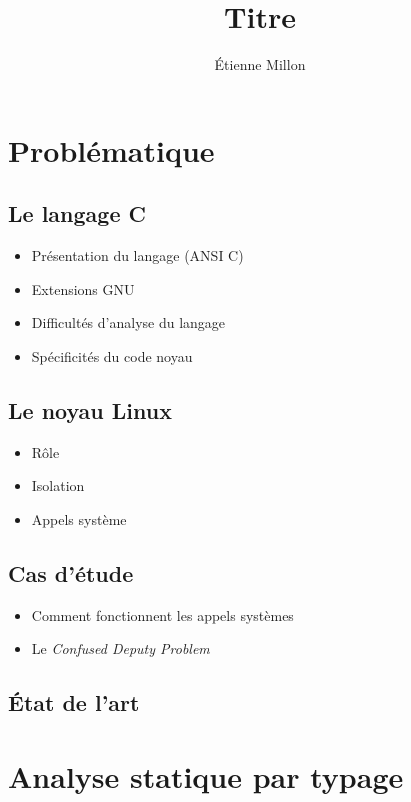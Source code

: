 \documentclass{phdthesis}
\title{Titre}
\author{Étienne Millon}
\begin{document}

\tableofcontents


\part{Problématique}

\chapter{Le langage C}

\begin{itemize}
\item Présentation du langage (ANSI C)
\item Extensions GNU
\item Difficultés d'analyse du langage
\item Spécificités du code noyau
\end{itemize}

\chapter{Le noyau Linux}

\begin{itemize}
\item Rôle
\item Isolation
\item Appels système
\end{itemize}

\chapter{Cas d'étude}

\begin{itemize}
\item Comment fonctionnent les appels systèmes
\item Le \emph{Confused Deputy Problem}
\end{itemize}

\chapter{État de l'art}

\part{Analyse statique par typage}
\end{document}
